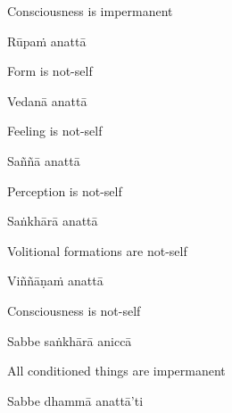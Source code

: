 \begin{english}
  Consciousness is impermanent\ifdigital\makeatletter\hyperlink{endnote19-appendix}\makeatother\fi
\end{english}

Rūpaṁ anattā

\begin{english}
  Form is not-self
\end{english}

Vedanā anattā

\begin{english}
  Feeling is not-self
\end{english}

Saññā anattā

\begin{english}
  Perception is not-self
\end{english}

Saṅkhārā anattā

\begin{english}
  Volitional formations are not-self\ifdigital\makeatletter\hyperlink{endnote20-appendix}\makeatother\fi
\end{english}

Viññāṇaṁ anattā

\begin{english}
  Consciousness is not-self\ifdigital\thinspace\makeatletter\hyperlink{endnote21-appendix}\makeatother\fi
\end{english}

Sabbe saṅkhārā aniccā

\begin{english}
  All conditioned things are impermanent\ifdigital\makeatletter\hyperlink{endnote22-appendix}\makeatother\fi
\end{english}

Sabbe dhammā anattā'ti

